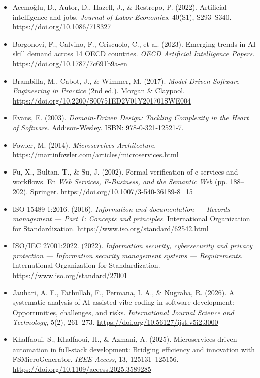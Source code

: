 \begin{itemize}[leftmargin=1.5em, label={}, itemsep=0.22ex, parsep=0pt]
\small\raggedright
{}
    \item Acemo\u{g}lu, D., Autor, D., Hazell, J., \& Restrepo, P. (2022). Artificial intelligence and jobs. \textit{Journal of Labor Economics}, 40(S1), S293--S340. \url{https://doi.org/10.1086/718327}
    \item Borgonovi, F., Calvino, F., Criscuolo, C., et al. (2023). Emerging trends in AI skill demand across 14 OECD countries. \textit{OECD Artificial Intelligence Papers}. \url{https://doi.org/10.1787/7c691b9a-en}
    \item Brambilla, M., Cabot, J., \& Wimmer, M. (2017). \textit{Model-Driven Software Engineering in Practice} (2nd ed.). Morgan \& Claypool. \url{https://doi.org/10.2200/S00751ED2V01Y201701SWE004}
    \item Evans, E. (2003). \textit{Domain-Driven Design: Tackling Complexity in the Heart of Software}. Addison-Wesley. ISBN: 978-0-321-12521-7.
    \item Fowler, M. (2014). \textit{Microservices Architecture}. \url{https://martinfowler.com/articles/microservices.html}
    \item Fu, X., Bultan, T., \& Su, J. (2002). Formal verification of e-services and workflows. En \textit{Web Services, E-Business, and the Semantic Web} (pp. 188--202). Springer. \url{https://doi.org/10.1007/3-540-36189-8_15}
    \item ISO 15489-1:2016. (2016). \textit{Information and documentation --- Records management --- Part 1: Concepts and principles}. International Organization for Standardization. \url{https://www.iso.org/standard/62542.html}
    \item ISO/IEC 27001:2022. (2022). \textit{Information security, cybersecurity and privacy protection --- Information security management systems --- Requirements}. International Organization for Standardization. \url{https://www.iso.org/standard/27001}
    \item Jauhari, A. F., Fathullah, F., Permana, I. A., \& Nugraha, R. (2026). A systematic analysis of AI-assisted vibe coding in software development: Opportunities, challenges, and risks. \textit{International Journal Science and Technology}, 5(2), 261--273. \url{https://doi.org/10.56127/ijst.v5i2.3000}
    \item Khalfaoui, S., Khalfaoui, H., \& Azmani, A. (2025). Microservices-driven automation in full-stack development: Bridging efficiency and innovation with FSMicroGenerator. \textit{IEEE Access}, 13, 125131--125156. \url{https://doi.org/10.1109/access.2025.3589285}

\end{itemize}
